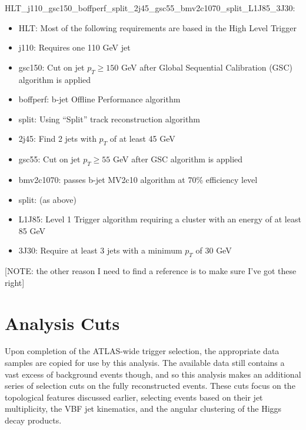        HLT\_j110\_gsc150\_boffperf\_split\_2j45\_gsc55\_bmv2c1070\_split\_L1J85\_3J30:
        \begin{itemize}
            \item HLT: Most of the following requirements are based in the High Level Trigger
            \item j110: Requires one 110 GeV jet
            \item gsc150: Cut on jet $p_T \geq 150$ GeV after Global Sequential Calibration (GSC) algorithm is applied
            \item boffperf: b-jet Offline Performance algorithm
            \item split: Using ``Split'' track reconstruction algorithm
            \item 2j45: Find 2 jets with $p_T$ of at least 45 GeV
            \item gsc55: Cut on jet $p_T \geq 55$ GeV after GSC algorithm is applied
            \item bmv2c1070: passes b-jet MV2c10 algorithm at 70\% efficiency level
            \item split: (as above)
            \item L1J85: Level 1 Trigger algorithm requiring a cluster with an energy of at least 85 GeV 
            \item 3J30: Require at least 3 jets with a minimum $p_T$ of 30 GeV
        \end{itemize}
        [NOTE: the other reason I need to find a reference is to make sure I've got these right]


        



    \FloatBarrier
    \section{Analysis Cuts} \label{sec:analysis_cuts}

        Upon completion of the ATLAS-wide trigger selection,
            the appropriate data samples are copied for use by this analysis.
        The available data still contains a vast excess of background events though,
            and so this analysis makes an additional series of selection cuts on the fully reconstructed events.
        These cuts focus on the topological features discussed earlier,
            selecting events based on their jet multiplicity,
            the VBF jet kinematics,
            and the angular clustering of the Higgs decay products.

